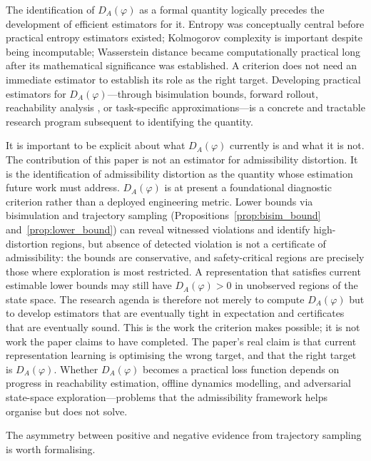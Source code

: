 \documentclass[11pt, a4paper]{article}
\theoremstyle{plain}
\theoremstyle{definition}
\theoremstyle{remark}
\newcommand{\DA}{D_A(\varphi)}
\begin{document}
The identification of $\DA$ as a formal quantity logically precedes the
development of efficient estimators for it. Entropy was conceptually central
before practical entropy estimators existed; Kolmogorov complexity is important
despite being incomputable; Wasserstein distance became computationally practical
long after its mathematical significance was established. A criterion does not
need an immediate estimator to establish its role as the right target. Developing
practical estimators for $\DA$---through bisimulation bounds, forward rollout,
reachability analysis \citep{tomlin2003computational}, or task-specific
approximations---is a concrete and tractable research program subsequent to
identifying the quantity.

It is important to be explicit about what $\DA$ currently is and what it is not. 
The contribution of this paper is not an estimator for admissibility distortion.
It is the identification of admissibility distortion as the quantity whose
estimation future work must address. $\DA$ is at present a foundational diagnostic
criterion rather than a deployed engineering metric. Lower bounds via bisimulation
and trajectory sampling (Propositions~\ref{prop:bisim_bound}
and~\ref{prop:lower_bound}) can reveal witnessed violations and identify
high-distortion regions, but absence of detected violation is not a certificate of
admissibility: the bounds are conservative, and safety-critical regions are
precisely those where exploration is most restricted. A representation that satisfies
current estimable lower bounds may still have $\DA > 0$ in unobserved regions of
the state space. The research agenda is therefore not merely to compute $\DA$ but
to develop estimators that are eventually tight in expectation and certificates that
are eventually sound. This is the work the criterion makes possible; it is not work
the paper claims to have completed. The paper's real claim is that current
representation learning is optimising the wrong target, and that the right target
is $\DA$. Whether $\DA$ becomes a practical loss function depends on progress in
reachability estimation, offline dynamics modelling, and adversarial state-space
exploration---problems that the admissibility framework helps organise but does
not solve.

The asymmetry between positive and negative evidence from trajectory sampling
is worth formalising.
\end{document}
